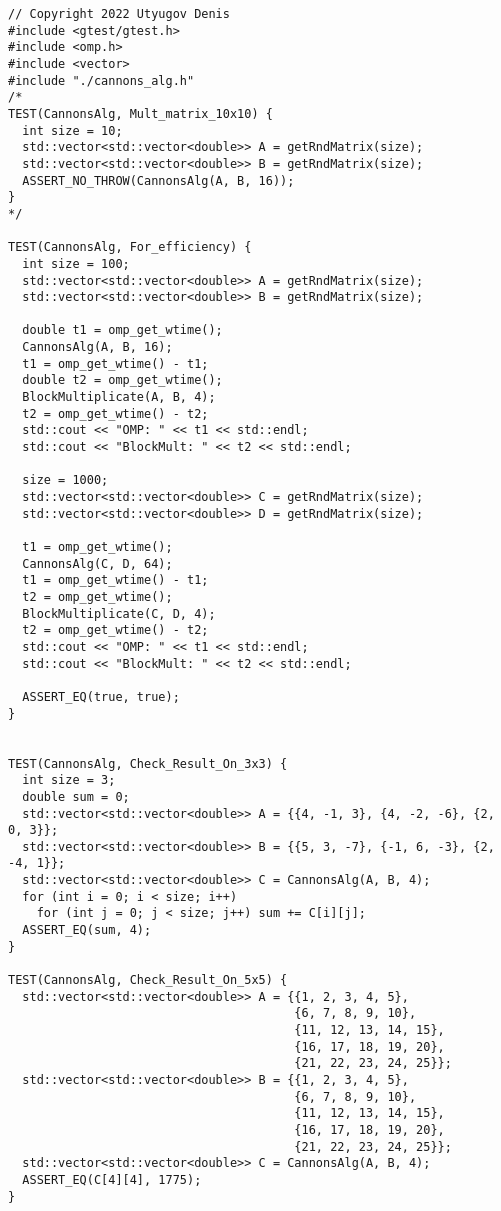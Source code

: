 \documentclass{report}
\begin{document}
\begin{lstlisting}
// Copyright 2022 Utyugov Denis
#include <gtest/gtest.h>
#include <omp.h>
#include <vector>
#include "./cannons_alg.h"
/*
TEST(CannonsAlg, Mult_matrix_10x10) {
  int size = 10;
  std::vector<std::vector<double>> A = getRndMatrix(size);
  std::vector<std::vector<double>> B = getRndMatrix(size);
  ASSERT_NO_THROW(CannonsAlg(A, B, 16));
}
*/

TEST(CannonsAlg, For_efficiency) {
  int size = 100;
  std::vector<std::vector<double>> A = getRndMatrix(size);
  std::vector<std::vector<double>> B = getRndMatrix(size);
  
  double t1 = omp_get_wtime();
  CannonsAlg(A, B, 16);
  t1 = omp_get_wtime() - t1;
  double t2 = omp_get_wtime();
  BlockMultiplicate(A, B, 4);
  t2 = omp_get_wtime() - t2;
  std::cout << "OMP: " << t1 << std::endl;
  std::cout << "BlockMult: " << t2 << std::endl;

  size = 1000;
  std::vector<std::vector<double>> C = getRndMatrix(size);
  std::vector<std::vector<double>> D = getRndMatrix(size);

  t1 = omp_get_wtime();
  CannonsAlg(C, D, 64);
  t1 = omp_get_wtime() - t1;
  t2 = omp_get_wtime();
  BlockMultiplicate(C, D, 4);
  t2 = omp_get_wtime() - t2;
  std::cout << "OMP: " << t1 << std::endl;
  std::cout << "BlockMult: " << t2 << std::endl;

  ASSERT_EQ(true, true);
}


TEST(CannonsAlg, Check_Result_On_3x3) {
  int size = 3;
  double sum = 0;
  std::vector<std::vector<double>> A = {{4, -1, 3}, {4, -2, -6}, {2, 0, 3}};
  std::vector<std::vector<double>> B = {{5, 3, -7}, {-1, 6, -3}, {2, -4, 1}};
  std::vector<std::vector<double>> C = CannonsAlg(A, B, 4);
  for (int i = 0; i < size; i++)
    for (int j = 0; j < size; j++) sum += C[i][j];
  ASSERT_EQ(sum, 4);
}

TEST(CannonsAlg, Check_Result_On_5x5) {
  std::vector<std::vector<double>> A = {{1, 2, 3, 4, 5},
                                        {6, 7, 8, 9, 10},
                                        {11, 12, 13, 14, 15},
                                        {16, 17, 18, 19, 20},
                                        {21, 22, 23, 24, 25}};
  std::vector<std::vector<double>> B = {{1, 2, 3, 4, 5},
                                        {6, 7, 8, 9, 10},
                                        {11, 12, 13, 14, 15},
                                        {16, 17, 18, 19, 20},
                                        {21, 22, 23, 24, 25}};
  std::vector<std::vector<double>> C = CannonsAlg(A, B, 4);
  ASSERT_EQ(C[4][4], 1775);
}


\end{lstlisting}
\end{document}
